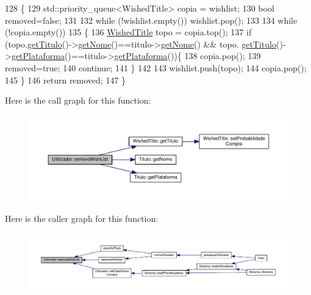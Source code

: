\begin{DoxyCode}
128                                              \{
129     std::priority\_queue<WishedTitle> copia = wishlist;
130     \textcolor{keywordtype}{bool} removed=\textcolor{keyword}{false};
131 
132     \textcolor{keywordflow}{while} (!wishlist.empty()) wishlist.pop();
133 
134     \textcolor{keywordflow}{while} (!copia.empty())
135     \{
136         \hyperlink{classWishedTitle}{WishedTitle} topo = copia.top();
137         \textcolor{keywordflow}{if} (topo.\hyperlink{classWishedTitle_a9ca6e92a26bb2f319a39d5a03b0c42bd}{getTitulo}()->\hyperlink{classTitulo_acb79279860b3404c6419697df5f860cb}{getNome}()==titulo->\hyperlink{classTitulo_acb79279860b3404c6419697df5f860cb}{getNome}() && topo.
      \hyperlink{classWishedTitle_a9ca6e92a26bb2f319a39d5a03b0c42bd}{getTitulo}()->\hyperlink{classTitulo_a2a57a31d40c5df012b3c6e2451c253dd}{getPlataforma}()==titulo->\hyperlink{classTitulo_a2a57a31d40c5df012b3c6e2451c253dd}{getPlataforma}())\{
138             copia.pop();
139             removed=\textcolor{keyword}{true};
140             \textcolor{keywordflow}{continue};
141         \}
142 
143         wishlist.push(topo);
144         copia.pop();
145     \}
146     \textcolor{keywordflow}{return} removed;
147 \}
\end{DoxyCode}
Here is the call graph for this function\+:
\nopagebreak
\begin{figure}[H]
\begin{center}
\leavevmode
\includegraphics[width=350pt]{classUtilizador_aa47c2fe835a73a23664149ccc7fbc10f_cgraph}
\end{center}
\end{figure}
Here is the caller graph for this function\+:
\nopagebreak
\begin{figure}[H]
\begin{center}
\leavevmode
\includegraphics[width=350pt]{classUtilizador_aa47c2fe835a73a23664149ccc7fbc10f_icgraph}
\end{center}
\end{figure}
\mbox{\label{classUtilizador_ac3c7ff821739e5682a5d06d0868031ac}} 
